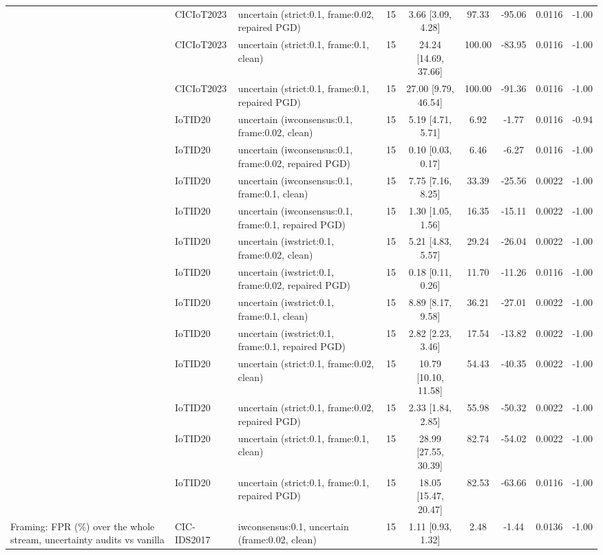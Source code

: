 \begin{table}[t]
\begin{tabular}{lllcccccc}
 & CICIoT2023 & uncertain (strict:0.1, frame:0.02, repaired PGD) & 15 & 3.66 [3.09, 4.28] & 97.33 & -95.06 & 0.0116 & -1.00 \\
 & CICIoT2023 & uncertain (strict:0.1, frame:0.1, clean) & 15 & 24.24 [14.69, 37.66] & 100.00 & -83.95 & 0.0116 & -1.00 \\
 & CICIoT2023 & uncertain (strict:0.1, frame:0.1, repaired PGD) & 15 & 27.00 [9.79, 46.54] & 100.00 & -91.36 & 0.0116 & -1.00 \\
 & IoTID20 & uncertain (iwconsensus:0.1, frame:0.02, clean) & 15 & 5.19 [4.71, 5.71] & 6.92 & -1.77 & 0.0116 & -0.94 \\
 & IoTID20 & uncertain (iwconsensus:0.1, frame:0.02, repaired PGD) & 15 & 0.10 [0.03, 0.17] & 6.46 & -6.27 & 0.0116 & -1.00 \\
 & IoTID20 & uncertain (iwconsensus:0.1, frame:0.1, clean) & 15 & 7.75 [7.16, 8.25] & 33.39 & -25.56 & 0.0022 & -1.00 \\
 & IoTID20 & uncertain (iwconsensus:0.1, frame:0.1, repaired PGD) & 15 & 1.30 [1.05, 1.56] & 16.35 & -15.11 & 0.0022 & -1.00 \\
 & IoTID20 & uncertain (iwstrict:0.1, frame:0.02, clean) & 15 & 5.21 [4.83, 5.57] & 29.24 & -26.04 & 0.0022 & -1.00 \\
 & IoTID20 & uncertain (iwstrict:0.1, frame:0.02, repaired PGD) & 15 & 0.18 [0.11, 0.26] & 11.70 & -11.26 & 0.0116 & -1.00 \\
 & IoTID20 & uncertain (iwstrict:0.1, frame:0.1, clean) & 15 & 8.89 [8.17, 9.58] & 36.21 & -27.01 & 0.0022 & -1.00 \\
 & IoTID20 & uncertain (iwstrict:0.1, frame:0.1, repaired PGD) & 15 & 2.82 [2.23, 3.46] & 17.54 & -13.82 & 0.0022 & -1.00 \\
 & IoTID20 & uncertain (strict:0.1, frame:0.02, clean) & 15 & 10.79 [10.10, 11.58] & 54.43 & -40.35 & 0.0022 & -1.00 \\
 & IoTID20 & uncertain (strict:0.1, frame:0.02, repaired PGD) & 15 & 2.33 [1.84, 2.85] & 55.98 & -50.32 & 0.0022 & -1.00 \\
 & IoTID20 & uncertain (strict:0.1, frame:0.1, clean) & 15 & 28.99 [27.55, 30.39] & 82.74 & -54.02 & 0.0022 & -1.00 \\
 & IoTID20 & uncertain (strict:0.1, frame:0.1, repaired PGD) & 15 & 18.05 [15.47, 20.47] & 82.53 & -63.66 & 0.0116 & -1.00 \\
Framing: FPR (\%) over the whole stream, uncertainty audits vs vanilla & CIC-IDS2017 & iwconsensus:0.1, uncertain (frame:0.02, clean) & 15 & 1.11 [0.93, 1.32] & 2.48 & -1.44 & 0.0136 & -1.00 \\

\end{tabular}
\end{table}
